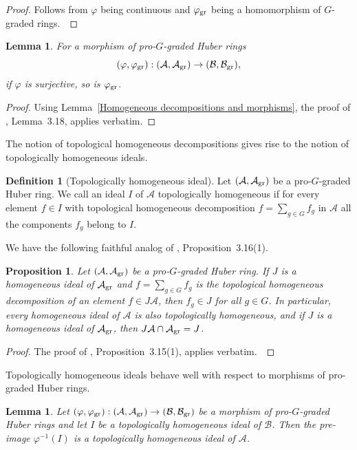 \documentclass[12pt,twoside,a4paper]{article}
\newtheorem{lemma}[thm]{Lemma}
\newtheorem{prop}[thm]{Proposition}
\theoremstyle{definition}
\newtheorem{mydef}[thm]{Definition}
\theoremstyle{remark}
\newcommand\gr{{\rm gr}}
\begin{document}
\begin{proof}Follows from $\varphi$ being continuous and $\varphi_{\gr}$ being a homomorphism of $G$-graded rings. \end{proof}
\begin{lemma}\label{Surjective morphisms of pro-graded rings}For a morphism of pro-$G$-graded Huber rings \begin{equation*}(\varphi, \varphi_{\gr}): (\mathcal{A}, \mathcal{A}_{\gr})\to (\mathcal{B}, \mathcal{B}_{\gr}),\end{equation*}if $\varphi$ is surjective, so is $\varphi_{\gr}$.\end{lemma}
\begin{proof}Using Lemma~\ref{Homogeneous decompositions and morphisms}, the proof of \cite{Ishizuka-Yoshikawa25}, Lemma~3.18, applies verbatim.\end{proof}
The notion of topological homogeneous decompositions gives rise to the notion of topologically homogeneous ideals.
\begin{mydef}[Topologically homogeneous ideal]\label{Topologically homogeneous ideal, definition}Let $(\mathcal{A}, \mathcal{A}_{\gr})$ be a pro-$G$-graded Huber ring. We call an ideal $I$ of $\mathcal{A}$ topologically homogeneous if for every element $f\in I$ with topological homogeneous decomposition $f=\sum_{g\in G}f_{g}$ in $\mathcal{A}$ all the components $f_{g}$ belong to $I$. \end{mydef}
We have the following faithful analog of \cite{Ishizuka-Yoshikawa25}, Proposition~3.16(1).
\begin{prop}\label{Detecting homogeneous ideals}Let $(\mathcal{A}, \mathcal{A}_{\gr})$ be a pro-$G$-graded Huber ring. If $J$ is a homogeneous ideal of $\mathcal{A}_{\gr}$ and $f=\sum_{g\in G}f_{g}$ is the topological homogeneous decomposition of an element $f\in J\mathcal{A}$, then $f_{g}\in J$ for all $g\in G$. In particular, every homogeneous ideal of $\mathcal{A}$ is also topologically homogeneous, and if $J$ is a homogeneous ideal of $\mathcal{A}_{\gr}$, then $J\mathcal{A}\cap \mathcal{A}_{\gr}=J$.\end{prop}
\begin{proof}The proof of \cite{Ishizuka-Yoshikawa25}, Proposition~3.15(1), applies verbatim. \end{proof}
Topologically homogeneous ideals behave well with respect to morphisms of pro-graded Huber rings.
\begin{lemma}\label{Graded maps and homogeneous ideals}Let $(\varphi, \varphi_{\gr}): (\mathcal{A}, \mathcal{A}_{\gr})\to (\mathcal{B}, \mathcal{B}_{\gr})$ be a morphism of pro-$G$-graded Huber rings and let $I$ be a topologically homogeneous ideal of $\mathcal{B}$. Then the pre-image $\varphi^{-1}(I)$ is a topologically homogeneous ideal of $\mathcal{A}$.\end{lemma}
\end{document}
